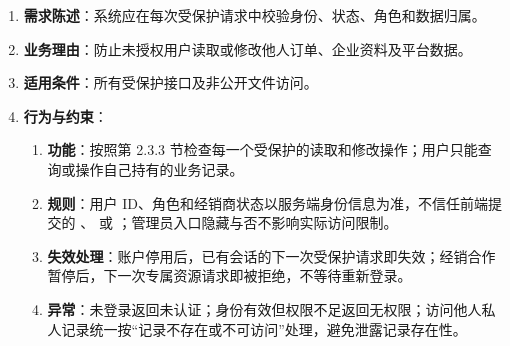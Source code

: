 \begin{enumerate}
\item {\bfseries 需求陈述}：系统应在每次受保护请求中校验身份、状态、角色和数据归属。
\item {\bfseries 业务理由}：防止未授权用户读取或修改他人订单、企业资料及平台数据。
\item {\bfseries 适用条件}：所有受保护接口及非公开文件访问。
\item {\bfseries 行为与约束}：
\begin{enumerate}
\item {\bfseries 功能}：按照第 2.3.3 节检查每一个受保护的读取和修改操作；用户只能查询或操作自己持有的业务记录。
\item {\bfseries 规则}：用户 ID、角色和经销商状态以服务端身份信息为准，不信任前端提交的 、 或 ；管理员入口隐藏与否不影响实际访问限制。
\item {\bfseries 失效处理}：账户停用后，已有会话的下一次受保护请求即失效；经销合作暂停后，下一次专属资源请求即被拒绝，不等待重新登录。
\item {\bfseries 异常}：未登录返回未认证；身份有效但权限不足返回无权限；访问他人私人记录统一按“记录不存在或不可访问”处理，避免泄露记录存在性。
\end{enumerate}

\end{enumerate}


